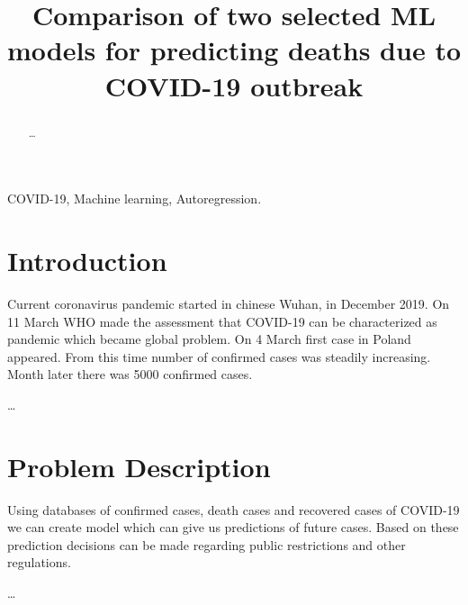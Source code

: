 \documentclass[conference]{IEEEtran}
\begin{document}
\title{Comparison of two selected ML models for predicting deaths due to COVID-19 outbreak}

\author{
\and
{}
}


\maketitle

\begin{abstract}
\dots
\end{abstract}

\begin{IEEEkeywords}
COVID-19, Machine learning, Autoregression.
\end{IEEEkeywords}

\section{Introduction}
Current coronavirus pandemic started in chinese Wuhan, in December 2019. On 11 March WHO made the assessment that COVID-19 can be
 characterized as pandemic which became global problem. On 4 March first case in Poland appeared. From this time number of confirmed cases was steadily increasing.
 Month later there was 5000 confirmed cases.

\dots

\section{Problem Description}
Using databases of confirmed cases, death cases and recovered cases of COVID-19 we can create model which can give us predictions of future cases.
 Based on these prediction decisions can be made regarding public restrictions and other regulations.

\dots
\end{document}
